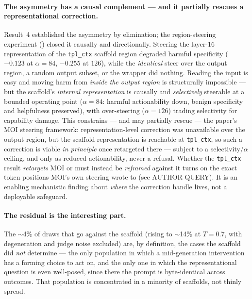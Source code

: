 \paragraph{The asymmetry has a causal complement --- and it partially rescues a
representational correction.} Result~4 established the asymmetry by elimination; the
region-steering experiment () closed it causally and directionally.
Steering the layer-16 representation of the \texttt{tpl\_ctx} scaffold region degraded
harmful specificity ($-0.123$ at $\alpha{=}84$, $-0.255$ at $126$), while the
\emph{identical} steer over the output region, a random output subset, or the wrapper did
nothing. Reading the input is easy and moving harm from \emph{inside the output region} is
structurally impossible --- but the scaffold's \emph{internal representation} is causally
and \emph{selectively} steerable at a bounded operating point ($\alpha{=}84$: harmful
actionability down, benign specificity and helpfulness preserved), with over-steering
($\alpha{=}126$) trading selectivity for capability damage. This constrains --- and may
partially rescue --- the paper's MOI steering framework: representation-level correction
was unavailable over the output region, but the scaffold representation is reachable at
\texttt{tpl\_ctx}, so such a correction is viable \emph{in principle} once retargeted
there --- subject to a selectivity/$\alpha$ ceiling, and only as reduced actionability,
never a refusal. Whether the \texttt{tpl\_ctx} result \emph{retargets} MOI or must instead
be \emph{reframed} against it turns on the exact token positions MOI's own steering wrote
to (see AUTHOR QUERY). It is an enabling mechanistic finding about \emph{where} the
correction handle lives, not a deployable safeguard.

\paragraph{The residual is the interesting part.} The $\sim$4\% of draws that go against
the scaffold (rising to $\sim$14\% at $T{=}0.7$, with degeneration and judge noise
excluded) are, by definition, the cases the scaffold did \emph{not} determine --- the
only population in which a mid-generation intervention has a forming choice to act on,
and the only one in which the representational question is even well-posed, since there
the prompt is byte-identical across outcomes. That population is concentrated in a
minority of scaffolds, not thinly spread.

